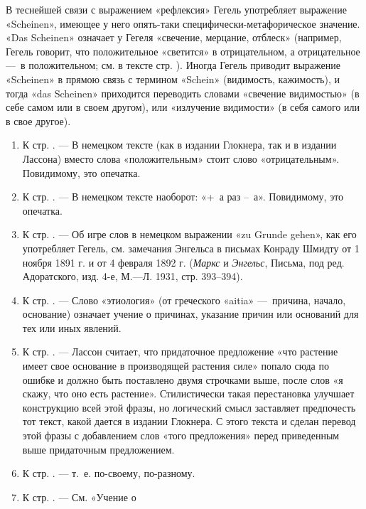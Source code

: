 В теснейшей связи с выражением «рефлексия» Гегель употребляет выражение
«Scheinen», имеющее у него опять-таки специфически-метафорическое значение.
«Das Scheinen» означает у Гегеля «свечение, мерцание, отблеск» (например,
Гегель говорит, что положительное «светится» в отрицательном, а
отрицательное —~в положительном; см. в тексте стр. \pageref{bkm:bm78a}).
Иногда Гегель приводит выражение «Scheinen» в прямою связь с термином
«Schein» (видимость, кажимость), и тогда «das Scheinen» приходится
переводить словами «свечение видимостью» (в себе самом или в своем другом),
или «излучение видимости» (в себя самого или в свое другое).

\begin{enumerate}
\item \label{bkm:Ref474666865}К стр. \pageref{bkm:bm79}. — В немецком тексте
(как в издании Глокнера, так и в издании Лассона) вместо слова
«положительным» стоит слово «отрицательным». Повидимому, это опечатка.
\item \label{bkm:Ref474666880}К стр. \pageref{bkm:bm80}. — В немецком тексте
наоборот: «+~а раз –~а». Повидимому, это опечатка.
\item \label{bkm:Ref474666891}К стр. \pageref{bkm:bm81}. — Об игре слов в
немецком выражении «zu Grunde gehen», как его употребляет Гегель, см.
замечания Энгельса в письмах Конраду Шмидту от 1 ноября 1891 г. и от 4
февраля 1892 г. ({\em Маркс} и {\em Энгельс}, Письма, под ред.
Адоратского, изд. 4-е, М.—Л. 1931, стр. 393–394).
\item \label{bkm:Ref474666904}К стр. \pageref{bkm:bm82}. — Слово «этиология»
(от греческого «aitia» —~причина, начало, основание) означает учение о
причинах, указание причин или оснований для тех или иных явлений.
\item \label{bkm:Ref474666911}К стр. \pageref{bkm:bm83}. — Лассон считает,
что придаточное предложение «что растение имеет свое основание в
производящей растения силе» попало сюда по ошибке и должно быть поставлено
двумя строчками выше, после слов «я скажу, что оно есть растение».
Стилистически такая перестановка улучшает конструкцию всей этой фразы, но
логический смысл заставляет предпочесть тот текст, какой дается в издании
Глокнера. С этого текста и сделан перевод этой фразы с добавлением слов
«того предложения» перед приведенным выше придаточным предложением.
\item \label{bkm:Ref474666923}К стр. \pageref{bkm:bm84}. — т.~е. по-своему,
по-разному.
\item \label{bkm:Ref474666940}К стр. \pageref{bkm:bm85}. — См. «Учение о

\end{enumerate}
